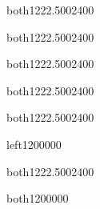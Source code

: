 \begin{WordParagraph}{both}{12}{22.5}{0}{0}{24}{0}{0}
\WordAutoSpaceOn
{}
\end{WordParagraph}

\begin{WordParagraph}{both}{12}{22.5}{0}{0}{24}{0}{0}
\WordAutoSpaceOn
{}
\end{WordParagraph}

\begin{WordParagraph}{both}{12}{22.5}{0}{0}{24}{0}{0}
\WordAutoSpaceOn
{}
\end{WordParagraph}

\begin{WordParagraph}{both}{12}{22.5}{0}{0}{24}{0}{0}
\WordAutoSpaceOn
{}
\end{WordParagraph}

\begin{WordParagraph}{both}{12}{22.5}{0}{0}{24}{0}{0}
\WordAutoSpaceOff
\WordEmpty
\end{WordParagraph}

\begin{WordParagraph}{left}{12}{}{0}{0}{0}{0}{0}
\WordAutoSpaceOn
\WordEmpty
\end{WordParagraph}

\begin{WordParagraph}{both}{12}{22.5}{0}{0}{24}{0}{0}
\WordAutoSpaceOff
\WordEmpty
\end{WordParagraph}

\newpage
\begin{WordParagraph}{both}{12}{}{0}{0}{0}{0}{0}
\WordAutoSpaceOn
\WordEmpty
\end{WordParagraph}

